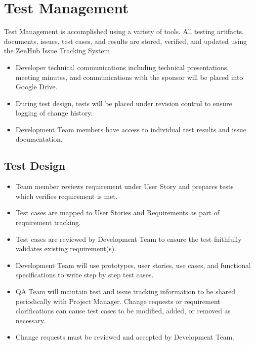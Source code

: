 \documentclass[letterpaper,10pt,english,openany,oneside]{sphinxmanual}
\begin{document}
\chapter{Test Management}
\label{\detokenize{test_plan/test_management:test-management}}\label{\detokenize{test_plan/test_management::doc}}
Test Management is accomplished using a variety of tools. All testing artifacts, documents, issues, test cases, and results are stored, verified, and updated using the ZenHub Issue Tracking System.
\begin{itemize}
\item {} 
Developer technical communications including technical presentations, meeting minutes, and communications with the sponsor will be placed into Google Drive.

\item {} 
During test design, tests will be placed under revision control to ensure logging of change history.

\item {} 
Development Team members have access to individual test results and issue documentation.

\end{itemize}


\section{Test Design}
\label{\detokenize{test_plan/test_management:test-design}}\begin{itemize}
\item {} 
Team member reviews requirement under User Story and prepares tests which verifies requirement is met.

\item {} 
Test cases are mapped to User Stories and Requirements as part of requirement tracking.

\item {} 
Test cases are reviewed by Development Team to ensure the test faithfully validates existing requirement(s).

\item {} 
Development Team will use prototypes, user stories, use cases, and functional specifications to write step by step test cases.

\item {} 
QA Team will maintain test and issue tracking information to be shared periodically with Project Manager. Change requests or requirement clarifications can cause test cases to be modified, added, or removed as necessary.

\item {} 
Change requests must be reviewed and accepted by Development Team.

\end{itemize}
\end{document}
